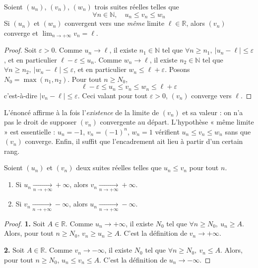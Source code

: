 \documentclass[11pt]{article}
\begin{document}
\begin{theo}
\label{theo:gendarmes}
Soient $(u_n)$, $(v_n)$, $(w_n)$ trois suites réelles telles que
\[\forall n\in\mathbb{N},\quad u_n \leq v_n \leq w_n\]
Si $(u_n)$ et $(w_n)$ convergent vers une \emph{même} limite $\ell\in\mathbb{R}$, alors $(v_n)$ converge et $\lim_{n\to+\infty}v_n=\ell$.
\end{theo}

\begin{proof}
Soit $\varepsilon>0$. Comme $u_n\to\ell$, il existe $n_1\in\mathbb{N}$ tel que $\forall n\geq n_1,\ |u_n-\ell|\leq\varepsilon$, et en particulier $\ell-\varepsilon\leq u_n$. Comme $w_n\to\ell$, il existe $n_2\in\mathbb{N}$ tel que $\forall n\geq n_2,\ |w_n-\ell|\leq\varepsilon$, et en particulier $w_n\leq\ell+\varepsilon$. Posons $N_0=\max(n_1,n_2)$. Pour tout $n\geq N_0$,
\[\ell-\varepsilon \leq u_n \leq v_n \leq w_n \leq \ell+\varepsilon\]
c'est-à-dire $|v_n-\ell|\leq\varepsilon$. Ceci valant pour tout $\varepsilon>0$, $(v_n)$ converge vers $\ell$.
\end{proof}

\begin{remarque}
L'énoncé affirme à la fois l'\emph{existence} de la limite de $(v_n)$ et sa valeur : on n'a pas le droit de supposer $(v_n)$ convergente au départ. L'hypothèse « même limite » est essentielle : $u_n=-1$, $v_n=(-1)^n$, $w_n=1$ vérifient $u_n\leq v_n\leq w_n$ sans que $(v_n)$ converge. Enfin, il suffit que l'encadrement ait lieu à partir d'un certain rang.
\end{remarque}

\begin{prop}
\label{prop:comparaison}
Soient $(u_n)$ et $(v_n)$ deux suites réelles telles que $u_n\leq v_n$ pour tout $n$.
\begin{enumerate}
\item Si $u_n\xrightarrow[n\to+\infty]{}+\infty$, alors $v_n\xrightarrow[n\to+\infty]{}+\infty$.
\item Si $v_n\xrightarrow[n\to+\infty]{}-\infty$, alors $u_n\xrightarrow[n\to+\infty]{}-\infty$.
\end{enumerate}
\end{prop}

\begin{proof}
\textbf{1.} Soit $A\in\mathbb{R}$. Comme $u_n\to+\infty$, il existe $N_0$ tel que $\forall n\geq N_0,\ u_n\geq A$. Alors, pour tout $n\geq N_0$, $v_n\geq u_n\geq A$. C'est la définition de $v_n\to+\infty$.

\textbf{2.} Soit $A\in\mathbb{R}$. Comme $v_n\to-\infty$, il existe $N_0$ tel que $\forall n\geq N_0,\ v_n\leq A$. Alors, pour tout $n\geq N_0$, $u_n\leq v_n\leq A$. C'est la définition de $u_n\to-\infty$.
\end{proof}
\end{document}
